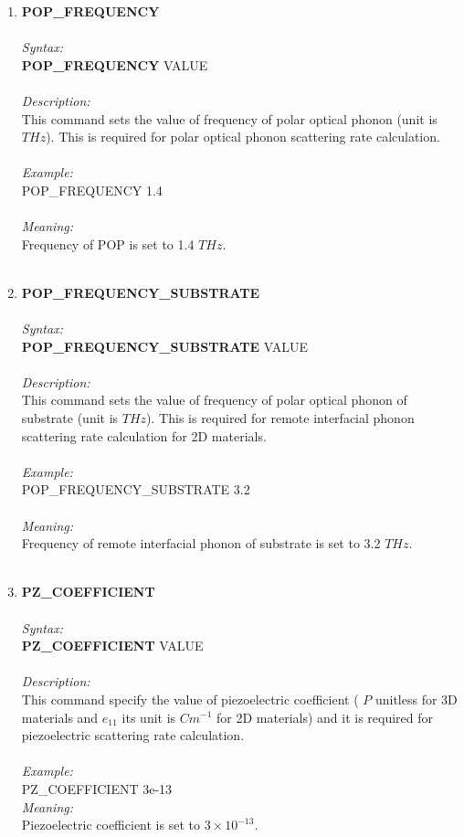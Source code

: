 \documentclass[12pt]{article}
\begin{document}
\begin{enumerate}
    \item \textbf{POP\_FREQUENCY}  \\ \\
    \textit{Syntax:} \\
    \textbf{POP\_FREQUENCY} VALUE \\ \\
    \textit{Description:} \\
    This command sets the value of frequency of polar optical phonon (unit is $THz$). This is required for polar optical phonon scattering rate calculation. \\ \\
    \textit{Example:} \\
    POP\_FREQUENCY 1.4 \\ \\
    \textit{Meaning:} \\   
    Frequency of POP is set to 1.4 $THz$. \\ \\ 

    \item \textbf{POP\_FREQUENCY\_SUBSTRATE}   \\ \\
    \textit{Syntax:} \\
    \textbf{POP\_FREQUENCY\_SUBSTRATE} VALUE \\ \\
    \textit{Description:} \\
    This command sets the value of frequency of polar optical phonon of substrate (unit is $THz$). This is required for remote interfacial phonon scattering rate calculation for 2D materials. \\ \\
    \textit{Example:} \\
    POP\_FREQUENCY\_SUBSTRATE 3.2 \\ \\
    \textit{Meaning:} \\   
    Frequency of remote interfacial phonon of substrate is set to 3.2 $THz$. \\ \\ 

    \item \textbf{PZ\_COEFFICIENT}   \\ \\
    \textit{Syntax:} \\
    \textbf{PZ\_COEFFICIENT} VALUE \\ \\
    \textit{Description:} \\
    This command specify the value of piezoelectric coefficient ( $P$ unitless for 3D materials and $e_{11}$ its unit is $Cm^{-1}$ for 2D materials) and it is required for piezoelectric scattering rate calculation. \\ \\
    \textit{Example:} \\
    PZ\_COEFFICIENT 3e-13 \\
    \textit{Meaning:} \\  
    Piezoelectric coefficient is set to $3 \times 10^{-13}$. \\ \\


\end{enumerate}
\end{document}
